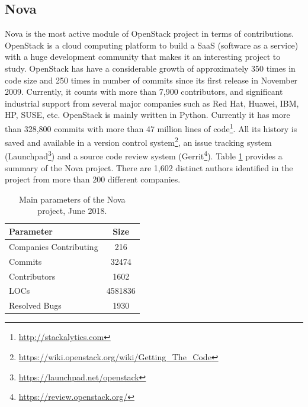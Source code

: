 \documentclass[a4paper, 12pt]{book}
\begin{document}
\subsection{Nova}

Nova is the most active module of OpenStack project in terms of contributions. OpenStack is a cloud computing platform to build a SaaS (software as a service) with a huge development community that makes it an interesting project to study. OpenStack has have a considerable growth of approximately 350 times in code size and 250 times in number of commits since its first release in November 2009.  Currently, it counts with more than 7,900 contributors, and significant industrial support from several major companies such as Red Hat, Huawei, IBM, HP, SUSE, etc. OpenStack is mainly written in Python. Currently it has more than 328,800 commits with more than 47 million lines of code\footnote{\url{http://stackalytics.com}}. All its history is saved and available in a version control system\footnote{\url{https://wiki.openstack.org/wiki/Getting_The_Code}}, an issue tracking system (Launchpad\footnote{\url{https://launchpad.net/openstack}}) and a source code review system (Gerrit\footnote{\url{https://review.openstack.org/}}).  Table \ref{tablenova} provides a summary of the Nova project. There are 1,602 distinct authors identified in the project from more than 200 different companies. 

 \begin{table}[!t]
\renewcommand{\arraystretch}{0.8}
\caption{Main parameters of the Nova project, June 2018.}
\label{tablenova}
\centering

\begin{tabular}{|l|c|}
\hline
Parameter & Size \\
\hline
\hline
Companies Contributing &  216 \\
\hline
Commits & 32474 \\
\hline
Contributors & 1602 \\
\hline
LOCs & 4581836\\
\hline
Resolved Bugs &1930\\
\hline
\end{tabular}
\end{table}
\end{document}

